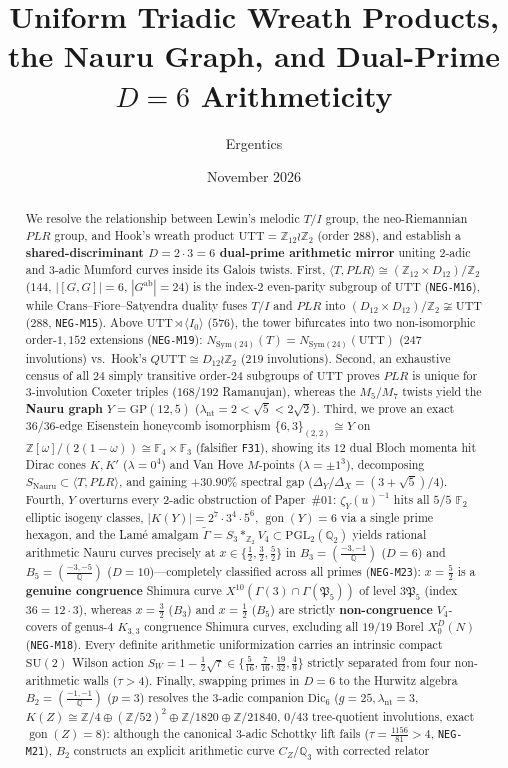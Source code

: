 \documentclass[11pt]{amsart}
\title[Triadic Wreath Products, Nauru, and Dual-Prime $D{=}6$]{Uniform Triadic Wreath Products, the Nauru Graph, and Dual-Prime $D{=}6$ Arithmeticity}
\author{Ergentics}
\date{November 2026}
\numberwithin{equation}{section}
\theoremstyle{plain}
\theoremstyle{definition}\newtheorem{definition}[theorem]{Definition}
\theoremstyle{remark}\newtheorem{remark}[theorem]{Remark}
\newcommand{\Q}{\mathbb{Q}}
\newcommand{\Z}{\mathbb{Z}}
\newcommand{\F}{\mathbb{F}}
\newcommand{\PGL}{\mathrm{PGL}}
\newcommand{\SU}{\mathrm{SU}}
\newcommand{\UTT}{\mathrm{UTT}}
\newcommand{\GP}{\mathrm{GP}}
\begin{document}
\begin{abstract}
We resolve the relationship between Lewin's melodic $T/I$ group, the neo-Riemannian $PLR$ group, and Hook's wreath product $\UTT=\Z_{12}\wr\Z_2$ (order $288$), and establish a \textbf{shared-discriminant $D=2\cdot 3=6$ dual-prime arithmetic mirror} uniting $2$-adic and $3$-adic Mumford curves inside its Galois twists. First, $\langle T,PLR\rangle\cong(\Z_{12}\times D_{12})/\Z_2$ ($144$, $|[G,G]|=6$, $|G^{\mathrm{ab}}|=24$) is the index-$2$ even-parity subgroup of $\UTT$ (\texttt{NEG-M16}), while Crans--Fiore--Satyendra duality fuses $T/I$ and $PLR$ into $(D_{12}\times D_{12})/\Z_2\not\cong\UTT$ ($288$, \texttt{NEG-M15}). Above $\UTT\rtimes\langle I_0\rangle$ ($576$), the tower bifurcates into two non-isomorphic order-$1{,}152$ extensions (\texttt{NEG-M19}): $N_{\mathrm{Sym}(24)}(T)=N_{\mathrm{Sym}(24)}(\UTT)$ ($247$ involutions) vs.\ Hook's $Q\UTT\cong D_{12}\wr\Z_2$ ($219$ involutions). Second, an exhaustive census of all $24$ simply transitive order-$24$ subgroups of $\UTT$ proves $PLR$ is unique for $3$-involution Coxeter triples ($168/192$ Ramanujan), whereas the $M_5/M_7$ twists yield the \textbf{Nauru graph} $Y=\GP(12,5)$ ($\lambda_{\mathrm{nt}}=2<\sqrt{5}<2\sqrt{2}$). Third, we prove an exact $36/36$-edge Eisenstein honeycomb isomorphism $\{6,3\}_{(2,2)}\cong Y$ on $\Z[\omega]/(2(1-\omega))\cong\F_4\times\F_3$ (falsifier \texttt{F31}), showing its $12$ dual Bloch momenta hit Dirac cones $K,K'$ ($\lambda=0^4$) and Van Hove $M$-points ($\lambda=\pm 1^3$), decomposing $S_{\mathrm{Nauru}}\subset\langle T,PLR\rangle$, and gaining $+30.90\%$ spectral gap ($\Delta_Y/\Delta_X=(3+\sqrt{5})/4$). Fourth, $Y$ overturns every $2$-adic obstruction of Paper~\#01: $\zeta_Y(u)^{-1}$ hits all $5/5$ $\F_2$ elliptic isogeny classes, $|K(Y)|=2^7\cdot 3^4\cdot 5^6$, $\operatorname{gon}(Y)=6$ via a single prime hexagon, and the Lam\'e amalgam $\tilde{\Gamma}=S_3*_{\Z_2}V_4\subset\PGL_2(\Q_2)$ yields rational arithmetic Nauru curves precisely at $x\in\{\tfrac12,\tfrac32,\tfrac52\}$ in $B_3=(\frac{-3,-1}{\Q})$ ($D=6$) and $B_5=(\frac{-3,-5}{\Q})$ ($D=10$)---completely classified across all primes (\texttt{NEG-M23}): $x=\tfrac52$ is a \textbf{genuine congruence} Shimura curve $X^{10}(\Gamma(3)\cap\Gamma(\mathfrak{P}_5))$ of level $3\mathfrak{P}_5$ (index $36=12\cdot 3$), whereas $x=\tfrac32$ ($B_3$) and $x=\tfrac12$ ($B_5$) are strictly \textbf{non-congruence} $V_4$-covers of genus-$4$ $K_{3,3}$ congruence Shimura curves, excluding all $19/19$ Borel $X_0^D(N)$ (\texttt{NEG-M18}). Every definite arithmetic uniformization carries an intrinsic compact $\SU(2)$ Wilson action $S_W=1-\tfrac12\sqrt{\tau}\in\{\tfrac{5}{16},\tfrac{7}{16},\tfrac{19}{32},\tfrac{4}{9}\}$ strictly separated from four non-arithmetic walls ($\tau>4$). Finally, swapping primes in $D=6$ to the Hurwitz algebra $B_2=(\frac{-1,-1}{\Q})$ ($p=3$) resolves the $3$-adic companion $\mathrm{Dic}_6$ ($g=25, \lambda_{\mathrm{nt}}=3$, $K(Z)\cong\Z/4\oplus(\Z/52)^2\oplus\Z/1820\oplus\Z/21840$, $0/43$ tree-quotient involutions, exact $\operatorname{gon}(Z)=8$): although the canonical $3$-adic Schottky lift fails ($\tau=\tfrac{1156}{81}>4$, \texttt{NEG-M21}), $B_2$ constructs an explicit arithmetic curve $C_Z/\Q_3$ with corrected relator 
\end{abstract}
\end{document}
